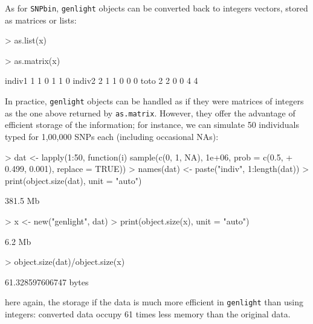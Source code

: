 \documentclass{article}
\begin{document}
As for \texttt{SNPbin}, \texttt{genlight} objects can be converted back to integers vectors, stored
as matrices or lists:
\begin{Schunk}
\begin{Sinput}
> as.list(x)
\end{Sinput}
\begin{Sinput}
> as.matrix(x)
\end{Sinput}
\begin{Soutput}
       [,1] [,2] [,3] [,4] [,5] [,6]
indiv1    1    1    0    1    1    0
indiv2    2    1    1    0    0    0
toto      2    2    0    0    4    4
\end{Soutput}
\end{Schunk}

\noindent In practice, \texttt{genlight} objects can be handled as if they were matrices of integers
as the one above returned by \texttt{as.matrix}.
However, they offer the advantage of efficient storage of the information; for instance, we can
simulate 50 individuals typed for 1,00,000 SNPs each (including occasional NAs):
\begin{Schunk}
\begin{Sinput}
> dat <- lapply(1:50, function(i) sample(c(0, 1, NA), 1e+06, prob = c(0.5, 
+     0.499, 0.001), replace = TRUE))
> names(dat) <- paste("indiv", 1:length(dat))
> print(object.size(dat), unit = "auto")
\end{Sinput}
\begin{Soutput}
381.5 Mb
\end{Soutput}
\begin{Sinput}
> x <- new("genlight", dat)
> print(object.size(x), unit = "auto")
\end{Sinput}
\begin{Soutput}
6.2 Mb
\end{Soutput}
\begin{Sinput}
> object.size(dat)/object.size(x)
\end{Sinput}
\begin{Soutput}
61.328597606747 bytes
\end{Soutput}
\end{Schunk}
here again, the storage if the data is much more efficient in \texttt{genlight} than using integers: converted data occupy
61 times less memory than the original data.
\\
\end{document}

